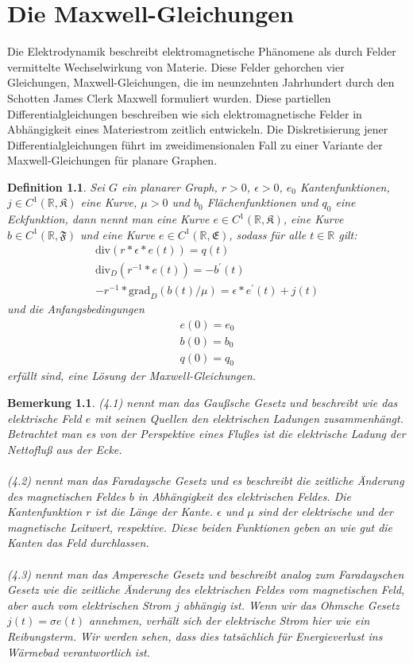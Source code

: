 \documentclass[11pt,a4paper,leqno]{report}
\newtheorem{definition}[theorem]{Definition}
\newtheorem{remark}[theorem]{Bemerkung}
\numberwithin{equation}{chapter}
\begin{document}
\chapter{Die Maxwell-Gleichungen}
Die Elektrodynamik beschreibt elektromagnetische Ph\"anomene als durch Felder vermittelte Wechselwirkung von Materie. Diese Felder gehorchen vier Gleichungen, Maxwell-Gleichungen, die im neunzehnten Jahrhundert durch den Schotten James Clerk Maxwell formuliert wurden. Diese partiellen Differentialgleichungen beschreiben wie sich elektromagnetische Felder in Abh\"angigkeit eines Materiestrom zeitlich entwickeln. Die Diskretisierung jener Differentialgleichungen  f\"uhrt im zweidimensionalen Fall zu einer Variante der Maxwell-Gleichungen f\"ur planare Graphen. 
\begin{definition}
	Sei $G$ ein planarer Graph, $r>0$, $\epsilon>0$, $e_0$ Kantenfunktionen, $j\in C^1(\mathbb{R}, \mathfrak{K})$ eine Kurve, $\mu>0$ und $b_0$ Fl\"achenfunktionen und $q_0$ eine Eckfunktion, dann nennt man eine Kurve $e\in C^1(\mathbb{R}, \mathfrak{K})$, eine Kurve $b\in C^1(\mathbb{R}, \mathfrak{F})$  und eine Kurve $e\in C^1(\mathbb{R}, \mathfrak{E})$, sodass f\"ur alle $t\in\mathbb{R}$ gilt:
	\begin{align}
		\text{div}(r * \epsilon * e(t)) = q(t)\\
		\text{div}_D(r^{-1} * e(t)) = -b^\prime(t)\\
		-r^{-1} * \text{grad}_D(b(t) / \mu) = \epsilon * e^\prime(t) + j(t)
	\end{align} 
	und die Anfangsbedingungen
\begin{align}
	e(0) = e_0\\
	b(0) = b_0\\
	q(0) = q_0
\end{align}
erf\"ullt sind, eine L\"osung der Maxwell-Gleichungen.
\end{definition}
\begin{remark}
	(4.1) nennt man das Gau\ss{}sche Gesetz und beschreibt wie das elektrische Feld $e$ mit seinen Quellen den elektrischen Ladungen zusammenh\"angt. Betrachtet man es von der Perspektive eines Flu\ss{}es ist die elektrische Ladung der Nettoflu\ss{} aus der Ecke.\\
	\\
	(4.2) nennt man das Faradaysche Gesetz und es beschreibt die zeitliche \"Anderung des magnetischen Feldes $b$ in Abh\"angigkeit des elektrischen Feldes. Die Kantenfunktion $r$ ist die L\"ange der Kante. $\epsilon$ und $\mu$ sind der elektrische und der magnetische Leitwert, respektive. Diese beiden Funktionen geben an wie gut die Kanten das Feld durchlassen.\\
	\\
	(4.3) nennt man das Amperesche Gesetz und beschreibt analog zum Faradayschen Gesetz wie die zeitliche \"Anderung des elektrischen Feldes vom magnetischen Feld, aber auch vom elektrischen Strom $j$ abh\"angig ist. Wenn wir das Ohmsche Gesetz $j(t) = \sigma e(t)$ annehmen, verh\"alt sich der elektrische Strom hier wie ein Reibungsterm. Wir werden sehen, dass dies tats\"achlich f\"ur Energieverlust ins W\"armebad verantwortlich ist.
\end{remark}
\end{document}
